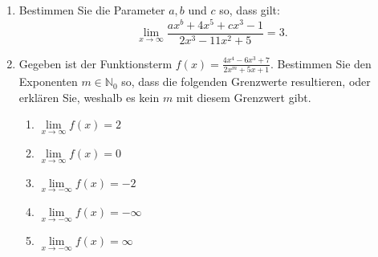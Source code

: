 \begin{enumerate}
          \begin{enumerate}
              \item $\lim\limits_{x \to \infty} \frac{2x^6 - 3x^5 + 7x^3 + 4x - 8}{5x^6 + 8x^5 - 9x^4 + 11x^2}$, \quad $\lim\limits_{x \to -\infty} \frac{2x^6 - 3x^5 + 7x^3 + 4x - 8}{5x^6 + 8x^5 - 9x^4 + 11x^2}$
              \item $\lim\limits_{x \to \infty} \frac{10x^8 - 4x^7 + 12}{x^9 + 3x^6 + 4}$, \quad $\lim\limits_{x \to -\infty} \frac{10x^8 - 4x^7 + 12}{x^9 + 3x^6 + 4}$
              \item  $\lim\limits_{x \to \infty} \frac{10x^8 - 4x^7 + 12}{x^7 + 3x^6 + 4}$, \quad $\lim\limits_{x \to -\infty} \frac{10x^8 - 4x^7 + 12}{x^7+ 3x^6 + 4}$
              \item   $\lim\limits_{x \to \infty} \frac{10x^8 - 4x^7 + 12}{ 3x^6 + 4}$, \quad $\lim\limits_{x \to -\infty} \frac{10x^8 - 4x^7 + 12}{3x^6 + 4}$
              \item $\lim\limits_{x \to \infty} \frac{\sqrt{x + 1}}{x - 1}$, \quad $\lim\limits_{x \to -\infty} \frac{\sqrt{x + 1}}{x - 1}$
              \item $\lim\limits_{x \to \infty} \frac{x^9 + x^4}{e^x}$, \quad $\lim\limits_{x \to -\infty} \frac{x^9 + x^4}{e^x}$
          \end{enumerate}
    \item Bestimmen Sie die Parameter $a, b$ und $c$ so, dass gilt:
          \[ \lim\limits_{x \to \infty} \frac{ax^b + 4x^5 + cx^3 - 1}{2x^3 - 11x^2 + 5} = 3. \]
    \item  Gegeben ist der Funktionsterm $f(x) = \frac{4x^4 - 6x^3 + 7}{2x^m + 5x + 1}$. Bestimmen Sie den Exponenten $m \in \mathbb{N}_0$ so, dass die folgenden Grenzwerte resultieren, oder erklären Sie, weshalb es kein $m$ mit diesem Grenzwert gibt.
          \begin{enumerate}
              \item $\lim\limits_{x \to \infty} f(x) = 2$
              \item $\lim\limits_{x \to \infty} f(x) = 0$
              \item $\lim\limits_{x \to -\infty} f(x) = -2$
              \item $\lim\limits_{x \to -\infty} f(x) = -\infty$
              \item $\lim\limits_{x \to -\infty} f(x) = \infty$
          \end{enumerate}
\end{enumerate}

\clearpage
